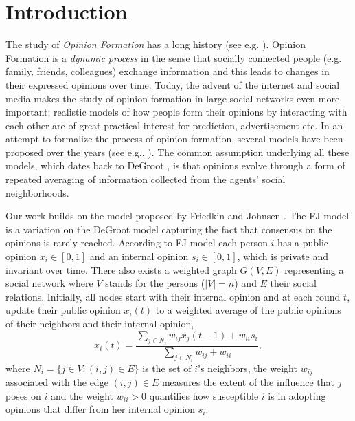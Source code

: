 \section{Introduction}

The study of \emph{Opinion Formation} has a long history (see e.g.
\cite{Jackson}). Opinion Formation is a \emph{dynamic process} in the sense
that socially connected people (e.g. family, friends, colleagues) exchange
information and this leads to changes in their expressed opinions over time.
Today, the advent of the internet and social media makes the study of opinion
formation in large social networks even more important; realistic models of how
people form their opinions by interacting with each other are of great
practical interest for prediction, advertisement etc. In an attempt to
formalize the process of opinion formation, several models have been proposed
over the years (see e.g., \cite{DeGroot,FJ90,HK,DNAW00}).  The common assumption
underlying all these models, which dates back to DeGroot \cite{DeGroot}, is
that opinions evolve through a form of repeated averaging of information
collected from the agents' social neighborhoods.

Our work builds on the model proposed by Friedkin and Johnsen \cite{FJ90}.  The
FJ model is a variation on the DeGroot model capturing the fact that consensus
on the opinions is rarely reached.  According to FJ model each person $i$ has a
public opinion $x_i \in [0,1]$ and an internal opinion $s_i\in [0,1]$, which is
private and invariant over time. There also exists a weighted graph $G(V,E)$
representing a social network where $V$ stands for the persons ($|V|=n$) and
$E$ their social relations. Initially, all nodes start with their internal
opinion and at each round $t$, update their public opinion $x_i(t)$ to a
weighted average of the public opinions of their neighbors and their internal
opinion,
%
\begin{equation}\label{eq:FJ_model}
  x_i(t)= \frac{\sum_{j\in N_i}w_{ij}x_j(t-1) + w_{ii}s_i}{\sum_{j\in
      N_i}w_{ij}+w_{ii}},
\end{equation}
%
where $N_i =\{j \in V:(i,j) \in E\}$ is the set of $i$'s neighbors, the weight
$w_{ij}$ associated with the edge $(i,j) \in E$ measures the extent of the
influence that $j$ poses on $i$ and the weight $w_{ii}>0$ quantifies how
susceptible $i$ is in adopting opinions that differ from her internal opinion
$s_i$.

